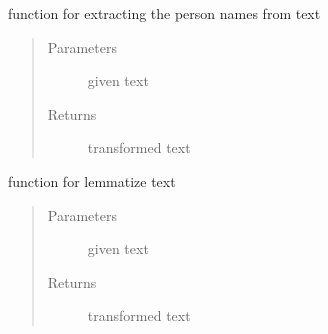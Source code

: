 \documentclass[letterpaper,10pt,english]{sphinxmanual}
\begin{document}
\begin{fulllineitems}
\label{\detokenize{index:data_preprocessing.data_preprocessing_functions.find_persons}}
\sphinxAtStartPar
function for extracting the person names from text
\begin{quote}\begin{description}
\item[{Parameters}] \leavevmode
\sphinxAtStartPar
{} \textendash{} given text

\item[{Returns}] \leavevmode
\sphinxAtStartPar
transformed text

\end{description}\end{quote}

\end{fulllineitems}


\begin{fulllineitems}
\label{\detokenize{index:data_preprocessing.data_preprocessing_functions.lemmatize_text}}
\sphinxAtStartPar
function for lemmatize text
\begin{quote}\begin{description}
\item[{Parameters}] \leavevmode
\sphinxAtStartPar
{} \textendash{} given text

\item[{Returns}] \leavevmode
\sphinxAtStartPar
transformed text

\end{description}\end{quote}

\end{fulllineitems}

\end{document}
